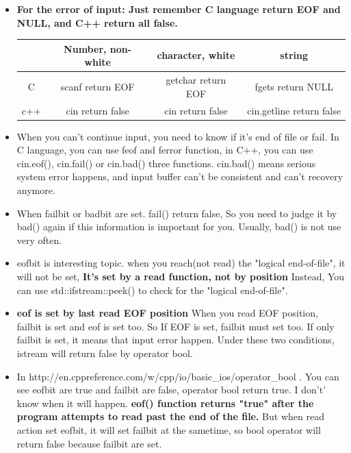 \documentclass[a4paper,11pt,twoside]{book}
\newcommand{\tophline}{\hline }
\newcommand{\bottomhline}{\\ \hline }
\newcommand{\tophline}{ }
\newcommand{\bottomhline}{ }
\begin{document}
\begin{itemize}
	\item \textbf{For the error of input: Just remember C language return EOF and NULL, and C++ return all false. }
	
	\begin{tabular}{|c|c|c|c|}
		\tophline
		& Number, non-white & character, white  & string \\
		\tophline
		C & scanf return EOF & getchar return EOF & fgets return NULL \\
		\tophline
		c++ & cin return false & cin return false & cin.getline return false \bottomhline
	\end{tabular}
	
	\item When you can't continue input, you need to know if it's end of file or fail. In C language, you can use feof and ferror function, in C++, you can use cin.eof(), cin.fail() or cin.bad() three functions. cin.bad() means serious system error happens, and input buffer can't be consistent and can't recovery anymore.
	
	\item When failbit or badbit are set. fail() return false, So you need to judge it by bad() again if this information is important for you.  Usually, bad() is not use very often.
	
	\item eofbit is interesting topic. when you reach(not read) the "logical end-of-file", it will not be set, \textbf{It's set by a read function, not by position}   Instead,  You can use std::ifstream::peek() to check for the "logical end-of-file".
	
	\item \textbf{eof is set by last read EOF position} When you read EOF position, failbit is set and eof is set too. So If EOF is set, failbit must set too.  If only failbit is set, it means that input error happen.  Under these two conditions, istream will return false by operator bool.
	
	\item In http://en.cppreference.com/w/cpp/io/basic\_ios/operator\_bool . You can see eofbit are true and failbit are false, operator bool return true. I don't' know when it will happen. \textbf{ eof() function returns "true" after the program attempts to read past the end of the file.}  But when read action set eofbit, it will set failbit at the sametime, so bool operator will return false because failbit are set.
	

\end{itemize}
\end{document}

